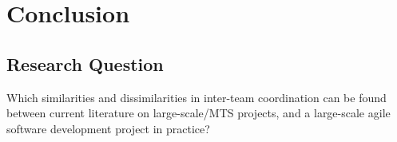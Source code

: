 \chapter{Conclusion}
\label{concl}

\minitoc


\newpage

\section{Research Question}

\begin{fancyquotes}
Which similarities and dissimilarities in inter-team coordination can be found between current literature on large-scale/MTS projects, and a large-scale agile software development project in practice?
\end{fancyquotes}
